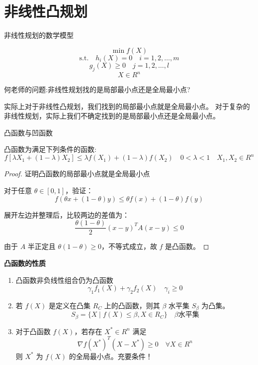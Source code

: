 \documentclass[12pt, a4paper, oneside, UTF8]{ctexbook}
\begin{document}
% 
\else
\fi

\chapter{非线性凸规划}

\begin{definition}
    非线性规划的数学模型

$$
\min f(X)
$$
$$
\text{s.t.} \quad h_i(X) = 0 \quad i = 1, 2, \ldots, m
$$
$$
g_j(X) \geq 0 \quad j = 1, 2, \ldots, l
$$
$$
X \in R^n
$$
\end{definition}

何老师的问题:非线性规划找的是局部最小点还是全局最小点?

实际上对于非线性凸规划，我们找到的局部最小点就是全局最小点。
对于复杂的非线性规划，实际上我们不确定找到的是局部最小点还是全局最小点。

\begin{definition}
    凸函数与凹函数

凸函数为满足下列条件的函数:
  $$
  f[\lambda X_1 + (1-\lambda)X_2] \leq \lambda f(X_1) + (1-\lambda)f(X_2) \quad 0 < \lambda < 1 \quad X_1, X_2 \in R^n
  $$
\end{definition}

\begin{proof}
    证明凸函数的局部最小点就是全局最小点

    对于任意 \( \theta \in [0, 1] \)，验证：
\[
f(\theta x + (1 - \theta)y) \leq \theta f(x) + (1 - \theta) f(y)
\]

展开左边并整理后，比较两边的差值为：
\[
\frac{\theta(1-\theta)}{2}(x - y)^T A (x - y) \leq 0
\]

由于 \( A \) 半正定且 \( \theta(1-\theta) \geq 0 \)，不等式成立，故 \( f \) 是凸函数。
\end{proof}

\textbf{凸函数的性质}

\begin{enumerate}
    \item 凸函数非负线性组合仍为凸函数
      \[
      \gamma_1 f_1(X) + \gamma_2 f_2(X) \quad \gamma_i \geq 0
      \]
    
    \item 若 \( f(X) \) 是定义在凸集 \( R_C \) 上的凸函数，则其 \( \beta \) 水平集 \( S_{\beta} \) 为凸集。
      \[
      S_{\beta} = \{ X \mid f(X) \leq \beta, X \in R_C \} \quad \beta \text{水平集}
      \]
    
    \item 对于凸函数 \( f(X) \)，若存在 \( X^* \in R^n \) 满足
      \[
      \nabla f(X^*)^T (X - X^*) \geq 0 \quad \forall X \in R^n
      \]
      则 \( X^* \) 为 \( f(X) \) 的全局最小点。充要条件！
\end{enumerate}
\end{document}
